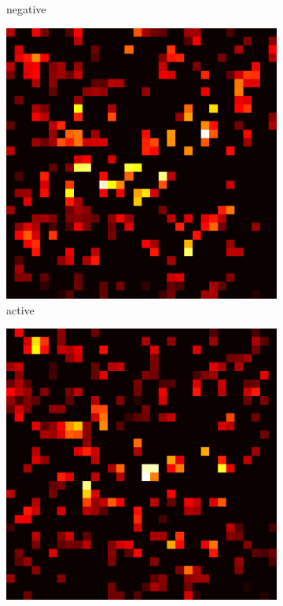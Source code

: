 \documentclass[preprint,12pt]{elsarticle}
\begin{document}
\begin{figure}
\begin{subfigure}{0.14\textwidth}
        \caption{negative}
    \end{subfigure}
    \hfill
    \begin{subfigure}{0.14\textwidth}
        \centering
        \includegraphics[width=\linewidth]{../visualizations/examples/cifar10/resnet18/active_saliency_map/0.png}
        \caption{active}
    \end{subfigure}
    \hfill
    \begin{subfigure}{0.14\textwidth}
        \centering
        \includegraphics[width=\linewidth]{../visualizations/examples/cifar10/resnet18/inactive_saliency_map/0.png}

\end{subfigure}
\end{figure}
\end{document}
